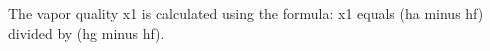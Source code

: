 The vapor quality x1 is calculated using the formula:  
x1 equals (ha minus hf) divided by (hg minus hf).
